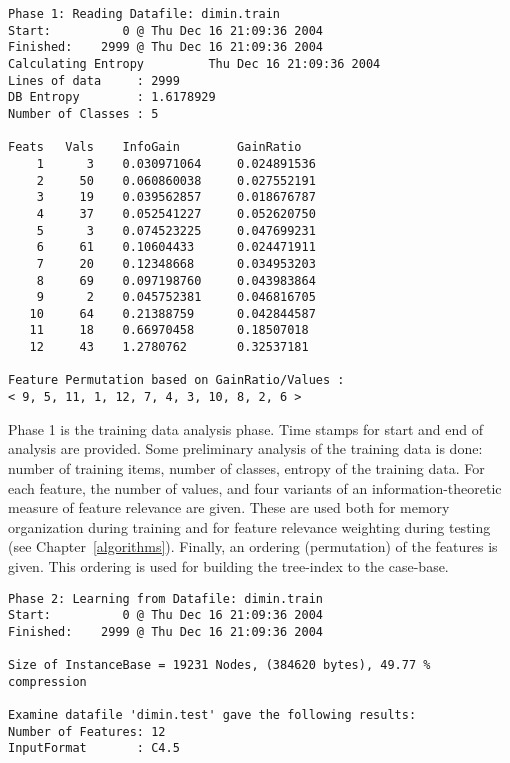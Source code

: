 \documentclass{report}
\begin{document}
{\footnotesize
\begin{verbatim}
Phase 1: Reading Datafile: dimin.train
Start:          0 @ Thu Dec 16 21:09:36 2004
Finished:    2999 @ Thu Dec 16 21:09:36 2004
Calculating Entropy         Thu Dec 16 21:09:36 2004
Lines of data     : 2999
DB Entropy        : 1.6178929
Number of Classes : 5

Feats   Vals    InfoGain        GainRatio
    1      3    0.030971064     0.024891536
    2     50    0.060860038     0.027552191
    3     19    0.039562857     0.018676787
    4     37    0.052541227     0.052620750
    5      3    0.074523225     0.047699231
    6     61    0.10604433      0.024471911
    7     20    0.12348668      0.034953203
    8     69    0.097198760     0.043983864
    9      2    0.045752381     0.046816705
   10     64    0.21388759      0.042844587
   11     18    0.66970458      0.18507018
   12     43    1.2780762       0.32537181

Feature Permutation based on GainRatio/Values :
< 9, 5, 11, 1, 12, 7, 4, 3, 10, 8, 2, 6 >
\end{verbatim}
}



Phase 1 is the training data analysis phase. Time stamps for start and
end of analysis are provided. Some preliminary analysis of the
training data is done: number of training items, number of classes,
entropy of the training data. For each feature, the number of values,
and four variants of an information-theoretic measure of feature
relevance are given. These are used both for memory organization
during training and for feature relevance weighting during testing
(see Chapter~\ref{algorithms}). Finally, an ordering (permutation) of
the features is given. This ordering is used for building the
tree-index to the case-base.




{\footnotesize
\begin{verbatim}
Phase 2: Learning from Datafile: dimin.train
Start:          0 @ Thu Dec 16 21:09:36 2004
Finished:    2999 @ Thu Dec 16 21:09:36 2004

Size of InstanceBase = 19231 Nodes, (384620 bytes), 49.77 % compression

Examine datafile 'dimin.test' gave the following results:
Number of Features: 12
InputFormat       : C4.5
\end{verbatim}
}
\end{document}
